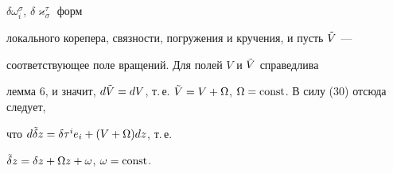 \begin{pf}
$\delta\omega^{\sigma}_i$, $\delta\varkappa_{\sigma}^{\tau}$ форм


локального корепера, связности, погружения и кручения, и пусть $\Tilde V$ ---


соответствующее поле вращений. Для полей $V$ и $\Tilde V$ справедлива


лемма 6, и значит, $d\Tilde V=dV$, т.\,е. $\Tilde


V=V+\Omega$, $\Omega=\const$. В силу (30) отсюда следует,


что $d\Tilde\delta z=\delta\tau^ie_i+(V+\Omega)dz$, т.\,е.


$\Tilde\delta


z=\delta z+\Omega z+\omega$, $\omega=\const$.


\end{pf}





